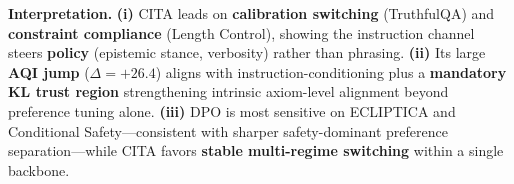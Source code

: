 \noindent\textbf{Interpretation.}
\textbf{(i)} \textsc{CITA} leads on \textbf{calibration switching} (TruthfulQA) and \textbf{constraint compliance} (Length Control), showing the instruction channel steers \textbf{policy} (epistemic stance, verbosity) rather than phrasing.
\textbf{(ii)} Its large \textbf{AQI jump} (\(\Delta=+26.4\)) aligns with instruction-conditioning plus a \textbf{mandatory KL trust region} strengthening intrinsic axiom-level alignment beyond preference tuning alone.
\textbf{(iii)} \textsc{DPO} is most sensitive on ECLIPTICA and Conditional Safety—consistent with sharper safety-dominant preference separation—while \textsc{CITA} favors \textbf{stable multi-regime switching} within a single backbone.

